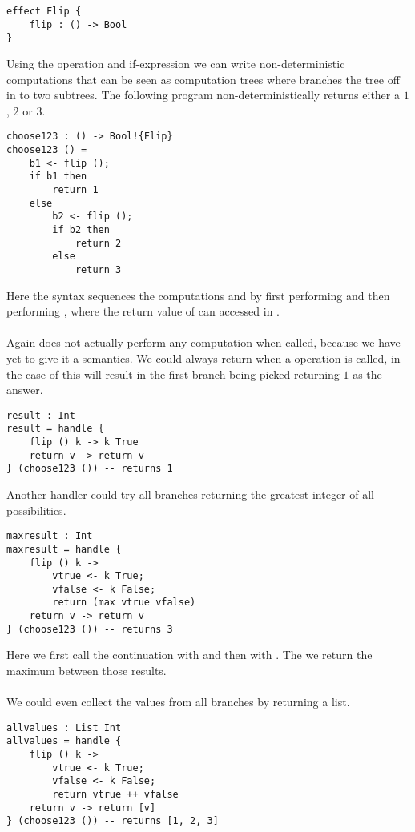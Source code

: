 {\begin{verbatim}
effect Flip {
	flip : () -> Bool
}
\end{verbatim}

Using the  operation and if-expression we can write non-deterministic computations that can be seen as computation trees where  branches the tree off in to two subtrees.
The following program  non-deterministically returns either a $1$, $2$ or $3$.

\begin{verbatim}
choose123 : () -> Bool!{Flip}
choose123 () =
	b1 <- flip ();
	if b1 then
		return 1
	else
		b2 <- flip ();
		if b2 then
			return 2
		else
			return 3
\end{verbatim}

Here the syntax  sequences the computations  and  by first performing  and then performing , where the return value of  can accessed in .
\\\\
Again  does not actually perform any computation when called, because we have yet to give it a semantics.
We could always return  when a  operation is called, in the case of  this will result in the first branch being picked returning $1$ as the answer.

\begin{verbatim}
result : Int
result = handle {
	flip () k -> k True
	return v -> return v
} (choose123 ()) -- returns 1
\end{verbatim}

Another handler could try all branches returning the greatest integer of all possibilities.

\begin{verbatim}
maxresult : Int
maxresult = handle {
	flip () k ->
		vtrue <- k True;
		vfalse <- k False;
		return (max vtrue vfalse)
	return v -> return v
} (choose123 ()) -- returns 3
\end{verbatim}

Here we first call the continuation  with  and then with .
The we return the maximum between those results.
\\\\
We could even collect the values from all branches by returning a list.
\begin{verbatim}
allvalues : List Int
allvalues = handle {
	flip () k ->
		vtrue <- k True;
		vfalse <- k False;
		return vtrue ++ vfalse
	return v -> return [v]
} (choose123 ()) -- returns [1, 2, 3]
\end{verbatim}

}
